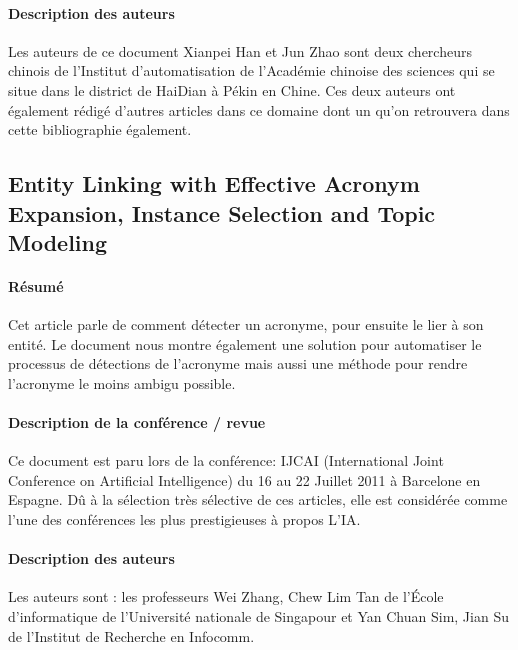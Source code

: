 \documentclass{article}
\begin{document}
\paragraph{Description des auteurs}
Les auteurs de ce document Xianpei Han et Jun Zhao sont deux chercheurs chinois de l'Institut d'automatisation de l'Académie chinoise des sciences qui se situe dans le district de HaiDian à Pékin en Chine. Ces deux auteurs ont également rédigé d'autres articles dans ce domaine dont un qu'on retrouvera dans cette bibliographie également.

\subsection{Entity Linking with Effective Acronym Expansion, Instance Selection and Topic Modeling\cite{article-9}}

\paragraph{Résumé}

Cet article parle de comment détecter un acronyme, pour ensuite le lier à son entité. Le document nous montre également une solution pour automatiser le processus de détections de l’acronyme mais aussi une méthode pour rendre l’acronyme le moins ambigu possible.

\paragraph{Description de la conférence / revue}

Ce document est paru lors de la conférence: IJCAI (International Joint Conference on Artificial Intelligence) du 16 au 22 Juillet 2011 à Barcelone en Espagne. Dû à la sélection très sélective de ces articles, elle est considérée comme l'une des conférences les plus prestigieuses à propos L'IA.

\paragraph{Description des auteurs}

Les auteurs sont : les professeurs Wei Zhang, Chew Lim Tan de l'École d'informatique de l'Université nationale de Singapour et Yan Chuan Sim, Jian Su de l'Institut de Recherche en Infocomm.
\end{document}
